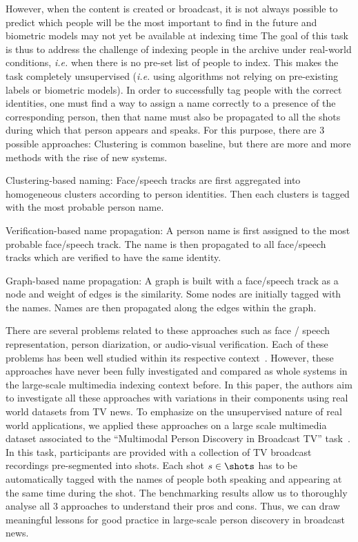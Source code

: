However, when the content is created or broadcast, it is not always possible to predict which people will be the most important to find in the future and biometric models may not yet be available at indexing time The goal of this task is thus to address the challenge of indexing people in the archive under real-world conditions, \emph{i.e.} when there is no pre-set list of people to index.
%
This makes the task completely unsupervised (\emph{i.e.} using algorithms not relying on pre-existing labels or biometric models).
%
In order to successfully tag people with the correct identities, one must find a way to assign a name correctly to a presence of the corresponding person, then that name must also be propagated to all the shots during which that person appears and speaks. For this purpose, there are 3 possible approaches:
%
Clustering is common baseline, but there are more and more methods with the rise of new systems.
%
\begin{compactitem}
\item{Clustering-based naming: Face/speech tracks are first aggregated into homogeneous clusters according to person identities. Then each clusters is tagged with the most probable person name.}
\item{Verification-based name propagation: A person name is first assigned to the most probable face/speech track. The name is then propagated to all face/speech tracks which are verified to have the same identity.}
\item{Graph-based name propagation: A graph is built with a face/speech track as a node and weight of edges is the similarity. Some nodes are initially tagged with the names. Names are then propagated along the edges within the graph.}
\end{compactitem}

There are several problems related to these approaches such as face / speech representation, person diarization, or audio-visual verification. Each of these problems has been well studied within its respective context~\cite{recog,veri,rep}. 
%
However, these approaches have never been fully investigated and compared as whole systems in the large-scale multimedia indexing context before. In this paper, the authors aim to investigate all these approaches with variations in their components using real world datasets from TV news. 
%
To emphasize on the unsupervised nature of real world applications, we applied these approaches on a large scale multimedia dataset associated to the ``Multimodal Person Discovery in Broadcast TV'' task~\cite{POIGNANT--MEDIAEVAL--2015,bredin2016mediaeval}. In this task, participants are provided with a collection of TV broadcast recordings pre-segmented into shots. Each shot $s \in \shots$ has to be automatically tagged with the names of people both speaking and appearing at the same time during the shot.
%
The benchmarking results allow us to thoroughly analyse all 3 approaches to understand their pros and cons. Thus, we can draw meaningful lessons for good practice in large-scale person discovery in broadcast news.

